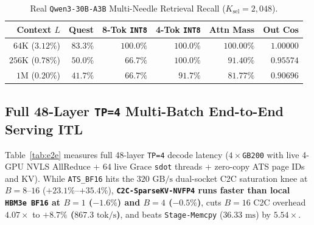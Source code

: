 \documentclass[conference,10pt]{IEEEtran}
\begin{document}
\begin{table}[t]
\centering
\caption{Real \texttt{Qwen3-30B-A3B} Multi-Needle Retrieval Recall ($K_{\text{sel}}{=}2{,}048$).}
\label{tab:needle}
\begin{tabular}{rrrrrr}
\toprule
\textbf{Context $L$} & \textbf{Quest} & \textbf{8-Tok \texttt{INT8}} & \textbf{4-Tok \texttt{INT8}} & \textbf{Attn Mass} & \textbf{Out Cos} \\
\midrule
$64\text{K}$ ($3.12\%$) & $83.3\%$ & $100.0\%$ & $\mathbf{100.0\%}$ & $100.00\%$ & $1.00000$ \\
$256\text{K}$ ($0.78\%$) & $50.0\%$ & $66.7\%$ & $\mathbf{100.0\%}$ & $91.40\%$ & $0.95574$ \\
$1\text{M}$ ($0.20\%$) & $41.7\%$ & $66.7\%$ & $\mathbf{91.7\%}$ & $81.77\%$ & $0.90696$ \\
\bottomrule
\end{tabular}
\end{table}

\subsection{Full 48-Layer \texttt{TP=4} Multi-Batch End-to-End Serving ITL}
Table~\ref{tab:e2e} measures full 48-layer \texttt{TP=4} decode latency ($4\times$\texttt{GB200} with live 4-GPU NVLS AllReduce + 64 live Grace \texttt{sdot} threads + zero-copy ATS page IDs and KV). While \texttt{ATS\_BF16} hits the $320\text{ GB/s}$ dual-socket C2C saturation knee at $B{=}8$--$16$ ($+23.1\%$--$+35.4\%$), \textbf{\texttt{C2C-SparseKV-NVFP4} runs faster than local \texttt{HBM3e BF16} at $B{=}1$ ($-1.6\%$) and $B{=}4$ ($-0.5\%$)}, cuts $B{=}16$ C2C overhead $4.07\times$ to \textbf{$+8.7\%$ ($867.3\text{ tok/s}$)}, and beats \texttt{Stage-Memcpy} ($36.33\text{ ms}$) by \textbf{$5.54\times$}.

\begin{table}[t]
\centering
\caption{Full 48-Layer \texttt{TP=4} End-to-End Decode ITL ($p50$, ms) on $4{\times}$\texttt{GB200} with Live 64-Core Grace 4-Tok \texttt{sdot} Indexer.}
\label{tab:e2e}
\end{table}
\end{document}
